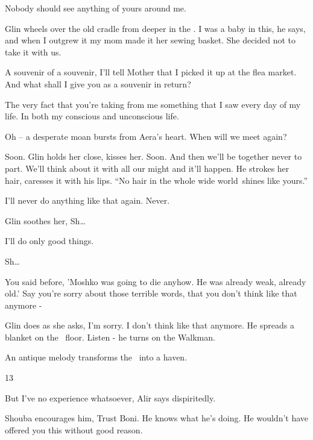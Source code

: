 \documentclass[letterpaper]{article}
\begin{document}
{\textquotedbl}Nobody should see anything of yours around me.{\textquotedbl} 

Glin wheels over the old cradle from deeper in the . {\textquotedbl}I was a baby in this,{\textquotedbl} he says,
{\textquotedbl}and when I outgrew it my mom made it her sewing basket. She decided not to take it with
us.{\textquotedbl} 

{\textquotedbl}A souvenir of a souvenir, I'll tell Mother that I picked it up at the flea market. And what shall I give
you as a souvenir in return?{\textquotedbl} 

{\textquotedbl}The very fact that you're taking from me something that I saw every day of my life. In both my conscious
and unconscious life.{\textquotedbl}

{\textquotedbl}Oh -- {\textquotedbl} a desperate moan bursts from Aera's heart. {\textquotedbl}When will we meet
again?{\textquotedbl} 

{\textquotedbl}Soon.{\textquotedbl} Glin holds her close, kisses her. {\textquotedbl}Soon. And then we'll be together
never to part. We'll think about it with all our might and it'll happen.{\textquotedbl} He strokes her hair, caresses
it with his lips. ``No hair in the whole wide world~shines like yours.''

{\textquotedbl}I'll never do anything like that again. Never.{\textquotedbl} 

Glin soothes her, {\textquotedbl}Sh{\dots}{\textquotedbl}~ 

{\textquotedbl}I'll do only good things.{\textquotedbl} 

{\textquotedbl}Sh{\dots}{\textquotedbl} 

{\textquotedbl}You said before, 'Moshko was going to die anyhow. He was already weak, already old.' Say you're sorry
about those terrible words, that you don't think like that anymore -{\textquotedbl} 

Glin does as she asks, {\textquotedbl}I'm sorry. I don't think like that anymore.{\textquotedbl} He spreads a blanket on
the \ floor. {\textquotedbl}Listen -{\textquotedbl} he turns on the Walkman.

An antique melody transforms the \ into a haven.


\bigskip

13

{\textquotedbl}But I've no experience whatsoever,{\textquotedbl} Alir says dispiritedly.

Shouba encourages him, {\textquotedbl}Trust Boni. He knows what he's doing. He wouldn't have offered you this without
good reason.{\textquotedbl} 
\end{document}
